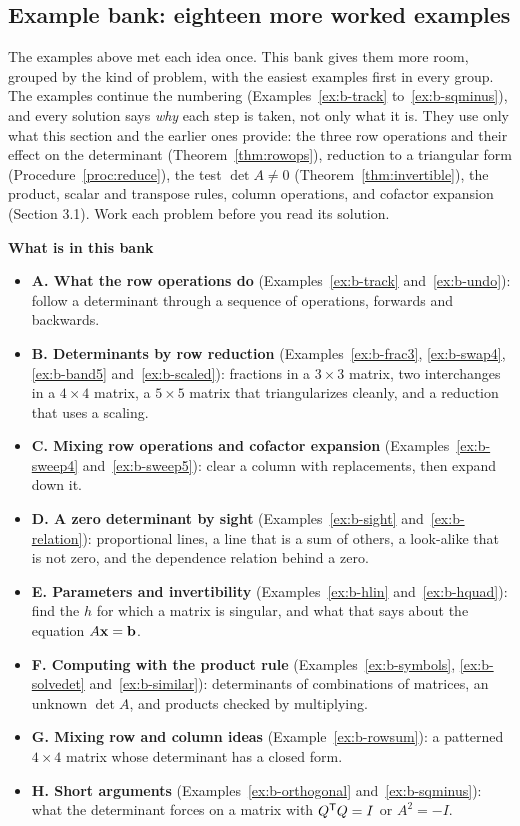 \documentclass[11pt]{article}
\begin{document}
\subsection*{Example bank: eighteen more worked examples}

The examples above met each idea once. This bank gives them more room, grouped by the kind of problem, with the easiest examples first in every group. The examples continue the numbering (Examples~\ref{ex:b-track} to~\ref{ex:b-sqminus}), and every solution says \emph{why} each step is taken, not only what it is. They use only what this section and the earlier ones provide: the three row operations and their effect on the determinant (Theorem~\ref{thm:rowops}), reduction to a triangular form (Procedure~\ref{proc:reduce}), the test $\det A\neq0$ (Theorem~\ref{thm:invertible}), the product, scalar and transpose rules, column operations, and cofactor expansion (Section 3.1). Work each problem before you read its solution.

\textbf{What is in this bank}
\begin{itemize}
  \item \textbf{A. What the row operations do} (Examples~\ref{ex:b-track} and~\ref{ex:b-undo}): follow a determinant through a sequence of operations, forwards and backwards.
  \item \textbf{B. Determinants by row reduction} (Examples~\ref{ex:b-frac3}, \ref{ex:b-swap4}, \ref{ex:b-band5} and~\ref{ex:b-scaled}): fractions in a $3\times3$ matrix, two interchanges in a $4\times4$ matrix, a $5\times5$ matrix that triangularizes cleanly, and a reduction that uses a scaling.
  \item \textbf{C. Mixing row operations and cofactor expansion} (Examples~\ref{ex:b-sweep4} and~\ref{ex:b-sweep5}): clear a column with replacements, then expand down it.
  \item \textbf{D. A zero determinant by sight} (Examples~\ref{ex:b-sight} and~\ref{ex:b-relation}): proportional lines, a line that is a sum of others, a look-alike that is not zero, and the dependence relation behind a zero.
  \item \textbf{E. Parameters and invertibility} (Examples~\ref{ex:b-hlin} and~\ref{ex:b-hquad}): find the $h$ for which a matrix is singular, and what that says about the equation $A\mathbf{x}=\mathbf{b}$.
  \item \textbf{F. Computing with the product rule} (Examples~\ref{ex:b-symbols}, \ref{ex:b-solvedet} and~\ref{ex:b-similar}): determinants of combinations of matrices, an unknown $\det A$, and products checked by multiplying.
  \item \textbf{G. Mixing row and column ideas} (Example~\ref{ex:b-rowsum}): a patterned $4\times4$ matrix whose determinant has a closed form.
  \item \textbf{H. Short arguments} (Examples~\ref{ex:b-orthogonal} and~\ref{ex:b-sqminus}): what the determinant forces on a matrix with $Q^{\mathsf T} Q=I$ or $A^2=-I$.
\end{itemize}
\end{document}
